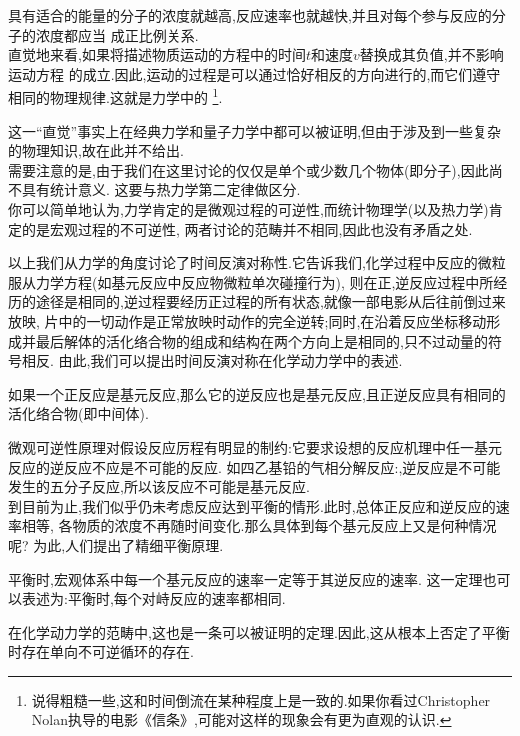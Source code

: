 \documentclass{ctexart}
\begin{document}
具有适合的能量的分子的浓度就越高,反应速率也就越快,并且对每个参与反应的分子的浓度都应当%
成正比例关系.\vspace{4pt}\\
\indent 直觉地来看,如果将描述物质运动的方程中的时间$t$和速度$v$替换成其负值,并不影响运动方程%
的成立.因此,运动的过程是可以通过恰好相反的方向进行的,而它们遵守相同的物理规律.这就是力学中的%
\footnote{说得粗糙一些,这和时间倒流在某种程度上是一致的.如果你看过Christopher Nolan执导的电影《信条》,可能对这样的现象会有更为直观的认识.}.
\begin{hint}
    这一“直觉”事实上在经典力学和量子力学中都可以被证明,但由于涉及到一些复杂的物理知识,故在此并不给出.\\
    需要注意的是,由于我们在这里讨论的仅仅是单个或少数几个物体(即分子),因此尚不具有统计意义.%
    这要与热力学第二定律做区分.\\
    你可以简单地认为,力学肯定的是微观过程的可逆性,而统计物理学(以及热力学)肯定的是宏观过程的不可逆性,%
    两者讨论的范畴并不相同,因此也没有矛盾之处.
\end{hint}
以上我们从力学的角度讨论了时间反演对称性.它告诉我们,化学过程中反应的微粒服从力学方程(如基元反应中反应物微粒单次碰撞行为),%
则在正,逆反应过程中所经历的途径是相同的,逆过程要经历正过程的所有状态,就像一部电影从后往前倒过来放映,%
片中的一切动作是正常放映时动作的完全逆转;同时,在沿着反应坐标移动形成并最后解体的活化络合物的组成和结构在两个方向上是相同的,只不过动量的符号相反.%
由此,我们可以提出时间反演对称在化学动力学中的表述.
\begin{theorem}[7C.1.4 微观可逆性原理]
    如果一个正反应是基元反应,那么它的逆反应也是基元反应,且正逆反应具有相同的活化络合物(即中间体).
\end{theorem}
微观可逆性原理对假设反应厉程有明显的制约:它要求设想的反应机理中任一基元反应的逆反应不应是不可能的反应.%
如四乙基铅的气相分解反应:,逆反应是不可能发生的五分子反应,所以该反应不可能是基元反应.\\
\indent 到目前为止,我们似乎仍未考虑反应达到平衡的情形.此时,总体正反应和逆反应的速率相等,%
各物质的浓度不再随时间变化.那么具体到每个基元反应上又是何种情况呢?%
为此,人们提出了精细平衡原理.
\begin{theorem}[7C.1.5 精细平衡原理]
    平衡时,宏观体系中每一个基元反应的速率一定等于其逆反应的速率.%
    这一定理也可以表述为:平衡时,每个对峙反应的速率都相同.
\end{theorem}
在化学动力学的范畴中,这也是一条可以被证明的定理.因此,这从根本上否定了平衡时存在单向不可逆循环的存在.%
\end{document}

